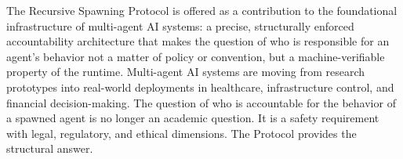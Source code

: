 The Recursive Spawning Protocol is offered as a contribution to the foundational infrastructure of multi-agent AI systems: a precise, structurally enforced accountability architecture that makes the question of who is responsible for an agent's behavior not a matter of policy or convention, but a machine-verifiable property of the runtime. Multi-agent AI systems are moving from research prototypes into real-world deployments in healthcare, infrastructure control, and financial decision-making. The question of who is accountable for the behavior of a spawned agent is no longer an academic question. It is a safety requirement with legal, regulatory, and ethical dimensions. The Protocol provides the structural answer.



